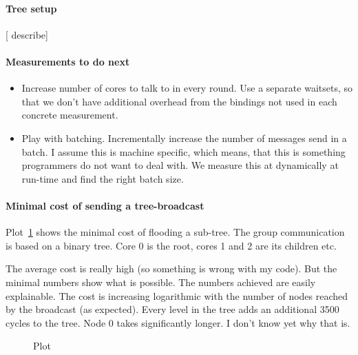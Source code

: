 \documentclass{article}
\newcommand{\stefan}[1]{
  {\color{skRed}[{\color{red}{SK}} #1]}}
\begin{document}
\paragraph{Tree setup} \stefan{describe}

\paragraph{Measurements to do next} %
\begin{itemize}
\item Increase number of cores to talk to in every round. Use a
  separate waitsets, so that we don't have additional overhead from
  the bindings not used in each concrete measurement.
\item Play with batching. Incrementally increase the number of
  messages send in a batch. I assume this is machine specific, which
  means, that this is something programmers do not want to deal
  with. We measure this at dynamically at run-time and find the right
  batch size.
\end{itemize}

\paragraph{Minimal cost of sending a tree-broadcast} %
Plot~\ref{pgfplot:201303141819} shows the minimal cost of flooding a
sub-tree. The group communication is based on a binary tree. Core 0 is
the root, cores 1 and 2 are its children etc.

The average cost is really high (so something is wrong with my
code). But the minimal numbers show what is possible. The numbers
achieved are easily explainable. The cost is increasing
logarithmic with the number of nodes reached by the broadcast (as
expected). Every level in the tree adds an additional 3500 cycles to
the tree. Node 0 takes significantly longer. I don't know yet why that
is.

\begin{figure}
  \caption{Plot}
  \label{pgfplot:201303141819}

\end{figure}
  
\end{document}
